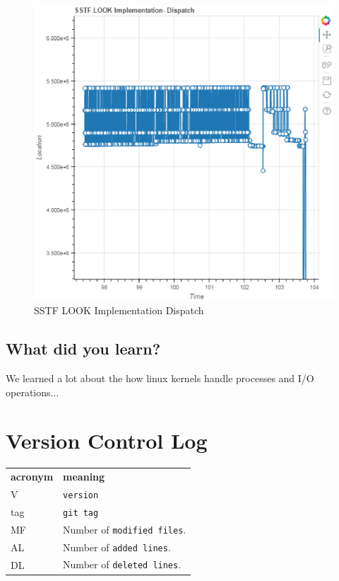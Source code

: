 \documentclass[letterpaper,10pt,titlepage, onecolumn, compsoc]{IEEEtran}
\begin{document}
\begin{figure}[b]
	\centering
      \includegraphics[]{afe.eps}
    \caption{SSTF LOOK Implementation Dispatch}
    \label{fig:output1}
\end{figure}
    

\subsection{What did you learn?}
We learned a lot about the how linux kernels handle processes and I/O operations...

\section{Version Control Log}
\begin{tabular}{lp{12cm}}
  \label{tabular:legend:git-log}
  \textbf{acronym} & \textbf{meaning} \\
  V & \texttt{version} \\
  tag & \texttt{git tag} \\
  MF & Number of \texttt{modified files}. \\
  AL & Number of \texttt{added lines}. \\
  DL & Number of \texttt{deleted lines}. \\
\end{tabular}
\end{document}
